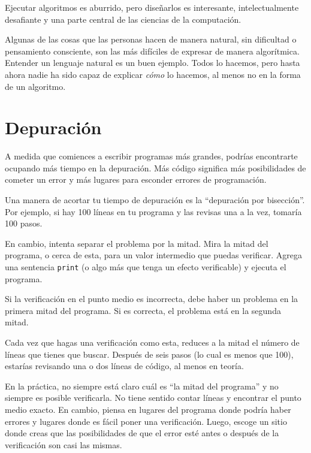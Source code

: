 \documentclass[10pt]{book}
\begin{document}
Ejecutar algoritmos es aburrido, pero diseñarlos es interesante,
intelectualmente desafiante y una parte central de las ciencias de la computación.

Algunas de las cosas que las personas hacen de manera natural, sin dificultad o
pensamiento consciente, son las más difíciles de expresar de manera algorítmica.
Entender un lenguaje natural es un buen ejemplo.  Todos lo hacemos, pero
hasta ahora nadie ha sido capaz de explicar {\em cómo} lo hacemos, al menos
no en la forma de un algoritmo.


\section{Depuración}
\label{bisectbug}

A medida que comiences a escribir programas más grandes, podrías encontrarte
ocupando más tiempo en la depuración.  Más código significa más posibilidades de
cometer un error y más lugares para esconder errores de programación.

Una manera de acortar tu tiempo de depuración es la ``depuración por bisección''.
Por ejemplo, si hay 100 líneas en tu programa y las
revisas una a la vez, tomaría 100 pasos.

En cambio, intenta separar el problema por la mitad.  Mira la mitad
del programa, o cerca de esta, para un valor intermedio que
puedas verificar.  Agrega una sentencia {\tt print} (o algo más
que tenga un efecto verificable) y ejecuta el programa.

Si la verificación en el punto medio es incorrecta, debe haber un problema en la
primera mitad del programa.  Si es correcta, el problema está
en la segunda mitad.

Cada vez que hagas una verificación como esta, reduces a la mitad el número
de líneas que tienes que buscar.  Después de seis pasos (lo cual es menos que 100),
estarías revisando una o dos líneas de código, al menos en teoría.

En la práctica, no siempre está claro cuál es
``la mitad del programa'' y no siempre es posible
verificarla.  No tiene sentido contar líneas y encontrar el
punto medio exacto.  En cambio, piensa en lugares
del programa donde podría haber errores y lugares donde es
fácil poner una verificación.  Luego, escoge un sitio donde
creas que las posibilidades de que el error esté antes o después
de la verificación son casi las mismas.
\end{document}
